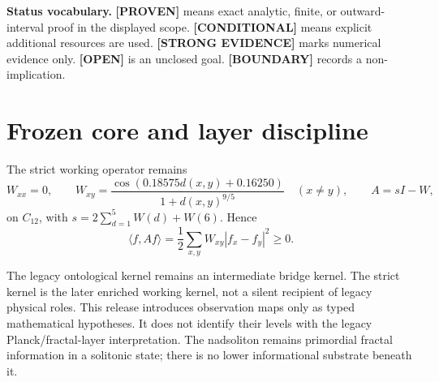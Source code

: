 \documentclass[11pt,a4paper]{article}
\newcommand{\proven}{\textcolor{green!40!black}{\textbf{[PROVEN]}}}
\newcommand{\strong}{\textcolor{blue!70!black}{\textbf{[STRONG EVIDENCE]}}}
\newcommand{\conditional}{\textcolor{violet!65!black}{\textbf{[CONDITIONAL]}}}
\newcommand{\openstatus}{\textcolor{red!72!black}{\textbf{[OPEN]}}}
\newcommand{\statusboundary}{\textcolor{orange!80!black}{\textbf{[BOUNDARY]}}}
\begin{document}
\begin{abstract}
ST181 solves three nonorthogonal commuting qubit phase errors with noisy syndrome and produces conic primal--dual certificates, giving fidelity $0.947717686823979$. ST182 derives an exact controlled detailed-balance selector trajectory but retains the preferred vertex, field, temperature, rate, and clock as inputs. ST183 gives two exact nonlinear response estimators for the missing degree-twelve coupling. ST184 certifies all 343 cells of a nuisance cube of halfwidth $10^{-4}$. ST186 separates exact noiseless factor reconstruction from noisy nonclosure and gauge ambiguity. ST187 proves the finite pair-path upper bound and finds strong evidence that it is exponentially loose: at $n=20$ its coefficient is over $4340$ times the completely enumerated observed coefficient. ST188 proves exact energy conservation of global register SWAP and finds strong numerical evidence against the four-dimensional static pairwise-SWAP generator ansatz. ST189 supplies an external-record validator but executes only a synthetic tamper test. No strict fractal hierarchy, selector, dimensions, external record, legacy-role transfer, Standard Model, gravity, or Theory-of-Everything closure follows.
\end{abstract}

\textbf{Status vocabulary.} \proven{} means exact analytic, finite, or outward-interval proof in the displayed scope. \conditional{} means explicit additional resources are used. \strong{} marks numerical evidence only. \openstatus{} is an unclosed goal. \statusboundary{} records a non-implication.

\tableofcontents
\newpage

\section{Frozen core and layer discipline}

The strict working operator remains
\begin{equation}
W_{xx}=0,\qquad
W_{xy}=\frac{\cos(0.18575d(x,y)+0.16250)}{1+d(x,y)^{9/5}}\quad(x\ne y),
\qquad A=sI-W,
\label{eq:strict}
\end{equation}
on $C_{12}$, with $s=2\sum_{d=1}^{5}W(d)+W(6)$. Hence
\[
\langle f,Af\rangle=\frac12\sum_{x,y}W_{xy}|f_x-f_y|^2\ge0.
\]

The legacy ontological kernel remains an intermediate bridge kernel. The strict kernel is the later enriched working kernel, not a silent recipient of legacy physical roles. This release introduces observation maps only as typed mathematical hypotheses. It does not identify their levels with the legacy Planck/fractal-layer interpretation. The nadsoliton remains primordial fractal information in a solitonic state; there is no lower informational substrate beneath it.
\end{document}
